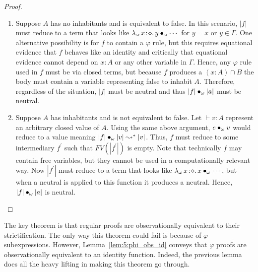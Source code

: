 \begin{proof}
    \begin{enumerate}
        \item {
            Suppose $A$ has no inhabitants and is equivalent to false.
            In this scenario, $|f|$ must reduce to a term that looks like ${\lambda_\omega}\, x\! : \! \diamond.\, y \bullet_{\omega} \cdots$ for $y = x$ or $y \in \Gamma$.
            One alternative possibility is for $f$ to contain a $\varphi$ rule, but this requires equational evidence that $f$ behaves like an identity and critically that equational evidence cannot depend on $x : A$ or any other variable in $\Gamma$.
            Hence, any $\varphi$ rule used in $f$ must be via closed terms, but because $f$ produces a $(x : A) \cap B$ the body must contain a variable representing false to inhabit $A$.
            Therefore, regardless of the situation, $|f|$ must be neutral and thus $|f| \bullet_{\omega} |a|$ must be neutral.
        }
        \item {
            Suppose $A$ has inhabitants and is not equivalent to false.
            Let $\vdash v : A$ represent an arbitrary closed value of $A$.
            Using the same above argument, $e \bullet_{\omega} v$ would reduce to a value meaning $|f| \bullet_{\omega} |v| \leadsto^* |v|$.
            Thus, $f$ must reduce to some intermediary $f^\prime$ such that $FV(|f^\prime|)$ is empty.
            Note that technically $f$ may contain free variables, but they cannot be used in a computationally relevant way.
            Now $|f^\prime|$ must reduce to a term that looks like ${\lambda_\omega}\, x\! : \! \diamond.\, x \bullet_{\omega} \cdots$, but when a neutral is applied to this function it produces a neutral.
            Hence, $|f| \bullet_{\omega} |a|$ is neutral.
        }
    \end{enumerate}
\end{proof}

The key theorem is that regular proofs are observationally equivalent to their strictification.
The only way this theorem could fail is because of $\varphi$ subexpressions.
However, Lemma~\ref{lem:5:phi_obs_id} conveys that $\varphi$ proofs are observationally equivalent to an identity function.
Indeed, the previous lemma does all the heavy lifting in making this theorem go through.

